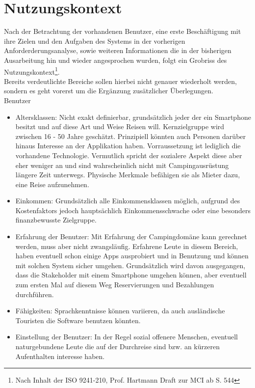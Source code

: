 
\section{Nutzungskontext}
Nach der Betrachtung der vorhandenen Benutzer, eine erste Beschäftigung mit ihre Zielen und den Aufgaben des Systems in der vorherigen Anforderderungsanalyse, sowie weiteren Informationen die in der bisherigen Ausarbeitung hin und wieder angesprochen wurden, folgt ein Grobriss des Nutzungskontext\footnote{Nach Inhalt der ISO 9241-210, Prof. Hartmann Draft zur MCI ab S. 544}.\\
Bereits verdeutlichte Bereiche sollen hierbei nicht genauer wiederholt werden, sondern es geht vorerst um die Ergänzung zusätzlicher Überlegungen.\\


Benutzer
\begin{itemize}
   \item 
   Altersklassen: Nicht exakt definierbar, grundsätzlich jeder der ein Smartphone besitzt und auf diese Art und Weise Reisen will. Kernzielgruppe wird zwischen 16 - 50 Jahre geschätzt. Prinzipiell könnten auch Personen darüber hinaus Interesse an der Applikation haben. Vorraussetzung ist lediglich die vorhandene Technologie. Vermutlich spricht der sozialere Aspekt diese aber eher weniger an und sind wahrscheinlich nicht mit Campingausrüstung längere Zeit unterwegs. Physische Merkmale befähigen sie als Mieter dazu, eine Reise aufzunehmen.

   \item 
   Einkommen: Grundsätzlich alle Einkommensklassen möglich, aufgrund des Kostenfaktors jedoch hauptsächlich Einkommensschwache oder eine besonders finanzbewusste Zielgruppe.

   \item 
   Erfahrung der Benutzer: Mit Erfahrung der Campingdomäne kann gerechnet werden, muss aber nicht zwangsläufig.
Erfahrene Leute in diesem Bereich, haben eventuell schon einige Apps ausprobiert und in Benutzung und können mit solchen System sicher umgehen.
   Grundsätzlich wird davon ausgegangen, dass die Stakeholder mit einem Smartphone umgehen können, aber eventuell zum ersten Mal auf diesem Weg Reservierungen und Bezahlungen durchführen. 

   \item
   Fähigkeiten: Sprachkenntnisse können variieren, da auch ausländische Touristen die Software benutzen könnten.

    \item 
    Einstellung der Benutzer: In der Regel sozial offenere Menschen, eventuell naturgebundene Leute die auf der Durchreise sind bzw. an kürzeren Aufenthalten interesse haben. 

   
\end{itemize}

